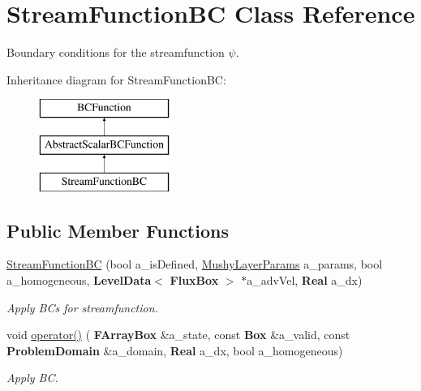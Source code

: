 \hypertarget{class_stream_function_b_c}{}\section{Stream\+Function\+BC Class Reference}
\label{class_stream_function_b_c}


Boundary conditions for the streamfunction $ \psi $.  


Inheritance diagram for Stream\+Function\+BC\+:\begin{figure}[H]
\begin{center}
\leavevmode
\includegraphics[height=3.000000cm]{class_stream_function_b_c}
\end{center}
\end{figure}
\subsection*{Public Member Functions}
\begin{DoxyCompactItemize}
\item 
\mbox{\label{class_stream_function_b_c_a48da0de78c77018a8607988d836ffed0}} 
\hyperlink{class_stream_function_b_c_a48da0de78c77018a8607988d836ffed0}{Stream\+Function\+BC} (bool a\+\_\+is\+Defined, \hyperlink{class_mushy_layer_params}{Mushy\+Layer\+Params} a\+\_\+params, bool a\+\_\+homogeneous, \textbf{ Level\+Data}$<$ \textbf{ Flux\+Box} $>$ $\ast$a\+\_\+adv\+Vel, \textbf{ Real} a\+\_\+dx)
\begin{DoxyCompactList}\small\item\em Apply B\+Cs for streamfunction. \end{DoxyCompactList}\item 
\mbox{\label{class_stream_function_b_c_ad87081663cc380e95de4fba24ddc4e39}} 
void \hyperlink{class_stream_function_b_c_ad87081663cc380e95de4fba24ddc4e39}{operator()} (\textbf{ F\+Array\+Box} \&a\+\_\+state, const \textbf{ Box} \&a\+\_\+valid, const \textbf{ Problem\+Domain} \&a\+\_\+domain, \textbf{ Real} a\+\_\+dx, bool a\+\_\+homogeneous)
\begin{DoxyCompactList}\small\item\em Apply BC. \end{DoxyCompactList}\end{DoxyCompactItemize}
